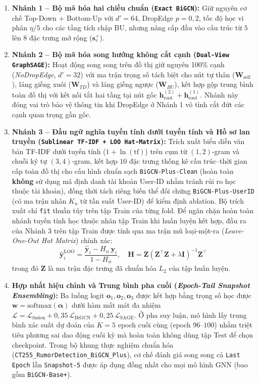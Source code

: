 \documentclass[11pt,a4paper]{extreport}
\begin{document}
\begin{enumerate}
    \item \textbf{Nhánh 1 -- Bộ mã hóa hai chiều chuẩn (\texttt{Exact BiGCN}):} Giữ nguyên cơ chế Top-Down + Bottom-Up với $d'=64$, DropEdge $p=0{,}2$, tốc độ học vi phân $\eta/5$ cho các tầng tích chập BU, nhưng nâng cấp đầu vào cấu trúc từ $5$ lên $8$ đặc trưng mở rộng ($\mathbf{s}_v^+$).
    \item \textbf{Nhánh 2 -- Bộ mã hóa song hướng không cắt cạnh (\texttt{Dual-View GraphSAGE}):} Hoạt động song song trên đồ thị giữ nguyên 100\% cạnh (\textit{NoDropEdge}, $d'=32$) với ma trận trọng số tách biệt cho nút tự thân ($\mathbf{W}_{\text{self}}$), láng giềng xuôi ($\mathbf{W}_{TD}$) và láng giềng ngược ($\mathbf{W}_{BU}$), kết hợp gộp trung bình toàn đồ thị với kết nối tắt hai tầng tại nút gốc $\mathbf{h}_{\text{root}}^{(2)} + \mathbf{h}_{\text{root}}^{(1)}$. Nhánh này đóng vai trò bảo vệ thông tin khi DropEdge ở Nhánh 1 vô tình cắt đứt các cạnh quan trọng gần gốc.
    \item \textbf{Nhánh 3 -- Đầu ngữ nghĩa tuyến tính dưới tuyến tính và Hồ sơ lan truyền (\texttt{Sublinear TF-IDF + LOO Hat-Matrix}):} Trích xuất biểu diễn văn bản TF-IDF dưới tuyến tính ($1 + \ln(\text{tf})$) trên cụm từ $(1,2)$-gram và chuỗi ký tự $(3,4)$-gram, kết hợp $10$ đặc trưng thống kê cấu trúc--thời gian cấp toàn đồ thị cho cấu hình chuẩn sạch \texttt{BiGCN-Plus-Clean} (hoàn toàn \textbf{không} sử dụng mã định danh tài khoản User-ID nhằm tránh rủi ro học thuộc tài khoản), đồng thời tách riêng biến thể đối chứng \texttt{BiGCN-Plus-UserID} (có ma trận nhân $K_u$ từ tần suất User-ID) để kiểm định ablation. Bộ trích xuất chỉ \texttt{fit} thuần túy trên tập Train của từng fold. Để ngăn chặn hoàn toàn nhánh tuyến tính học thuộc nhãn tập Train khi huấn luyện kết hợp, đầu ra của Nhánh 3 trên tập Train được tính qua ma trận mũ loại-một-ra (\textit{Leave-One-Out Hat Matrix}) chính xác:
    \begin{equation}
        \hat{\mathbf{y}}_i^{\text{LOO}} = \frac{\hat{\mathbf{y}}_i - H_{ii}\,\mathbf{y}_i}{1 - H_{ii}}, \quad \mathbf{H} = \mathbf{Z}(\mathbf{Z}^\top \mathbf{Z} + \lambda \mathbf{I})^{-1}\mathbf{Z}^\top
        \label{eq:loo-hat}
    \end{equation}
    trong đó $\mathbf{Z}$ là ma trận đặc trưng đã chuẩn hóa $L_2$ của tập huấn luyện.
    \item \textbf{Hợp nhất hiệu chỉnh và Trung bình pha cuối (\textit{Epoch-Tail Snapshot Ensembling}):} Ba luồng logit $\mathbf{o}_1, \mathbf{o}_2, \mathbf{o}_3$ được kết hợp bằng trọng số học được $\mathbf{w} = \text{softmax}(\boldsymbol{\alpha})$ dưới hàm mất mát đa nhiệm $\mathcal{L} = \mathcal{L}_{\text{fusion}} + 0{,}35\,\mathcal{L}_{\text{BiGCN}} + 0{,}25\,\mathcal{L}_{\text{SAGE}}$. Ở pha suy luận, mô hình lấy trung bình xác suất dự đoán của $K = 5$ epoch cuối cùng (epoch $96\text{--}100$) nhằm triệt tiêu phương sai dao động cuối kỳ mà hoàn toàn không dùng tập Test để chọn checkpoint. Trong bộ khung thực nghiệm chuẩn hóa (\texttt{CT255\_\-RumorDetection\_\-BiGCN\_Plus}), cơ chế đánh giá song song cả \texttt{Last Epoch} lẫn \texttt{Snapshot-5} được áp dụng đồng nhất cho mọi mô hình GNN (bao gồm \texttt{BiGCN-Base+}).
\end{enumerate}
\end{document}
